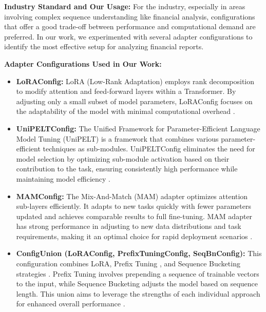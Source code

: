 \documentclass[conference]{IEEEtran}
\begin{document}
\textbf{Industry Standard and Our Usage:} For the industry, especially in areas involving complex sequence understanding like financial analysis, configurations that offer a good trade-off between performance and computational demand are preferred. In our work, we experimented with several adapter configurations to identify the most effective setup for analyzing financial reports.

\textbf{Adapter Configurations Used in Our Work:}
\begin{itemize}
    \item \textbf{LoRAConfig:} LoRA (Low-Rank Adaptation) employs rank decomposition to modify attention and feed-forward layers within a Transformer. By adjusting only a small subset of model parameters, LoRAConfig focuses on the adaptability of the model with minimal computational overhead \cite{hu2021lora}.
    \item \textbf{UniPELTConfig:} The Unified Framework for Parameter-Efficient Language Model Tuning (UniPELT) is a framework that combines various parameter-efficient techniques as sub-modules. UniPELTConfig eliminates the need for model selection by optimizing sub-module activation based on their contribution to the task, ensuring consistently high performance while maintaining model efficiency \cite{mao2022unipelt}.
    \item \textbf{MAMConfig:} The Mix-And-Match (MAM) adapter optimizes attention sub-layers efficiently. It adapts to new tasks quickly with fewer parameters updated and achieves comparable results to full fine-tuning. MAM adapter has strong performance in adjusting to new data distributions and task requirements, making it an optimal choice for rapid deployment scenarios \cite{he2022unified}.
    \item \textbf{ConfigUnion (LoRAConfig, PrefixTuningConfig, SeqBnConfig):} This configuration combines LoRA, Prefix Tuning \cite{li2021prefixtuning}, and Sequence Bucketing strategies \cite{pfeiffer2020madx}. Prefix Tuning involves prepending a sequence of trainable vectors to the input, while Sequence Bucketing adjusts the model based on sequence length. This union aims to leverage the strengths of each individual approach for enhanced overall performance \cite{pfeiffer2020adapterhub}.
\end{itemize}
\end{document}
